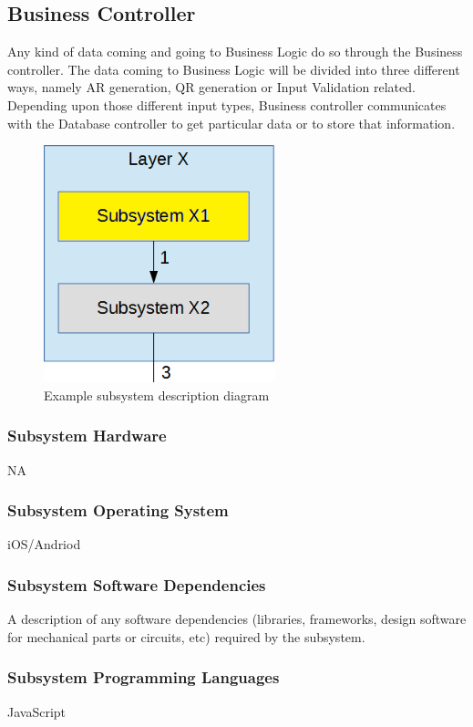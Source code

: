 \subsection{Business Controller}
Any kind of data coming and going to Business Logic do so through the Business controller. The data coming to Business Logic will be divided into three different ways, namely AR generation, QR generation or Input Validation related. Depending upon those different input types, Business controller communicates with the Database controller to get particular data or to store that information.

\begin{figure}[h!]
	\centering
 	\includegraphics[width=0.60\textwidth]{images/subsystem}
 \caption{Example subsystem description diagram}
\end{figure}

\subsubsection{Subsystem Hardware}
NA

\subsubsection{Subsystem Operating System}
iOS/Andriod

\subsubsection{Subsystem Software Dependencies}
A description of any software dependencies (libraries, frameworks, design software for mechanical parts or circuits, etc) required by the subsystem.

\subsubsection{Subsystem Programming Languages}
JavaScript

